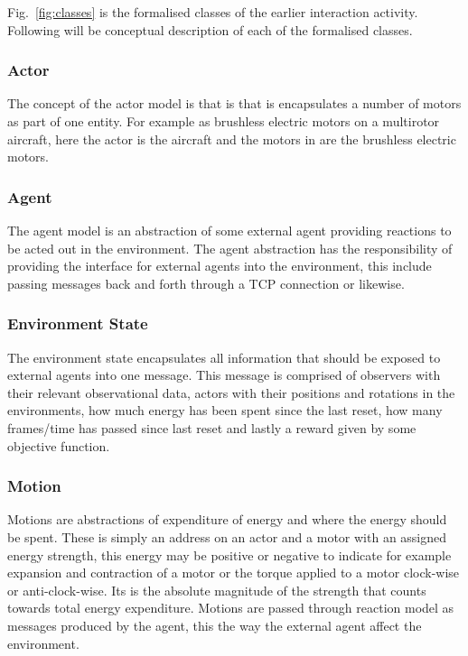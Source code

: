 Fig.~\ref{fig:classes} is the formalised classes of the earlier interaction activity. Following will be conceptual description of each of the formalised classes.

\subsubsection{Actor}

The concept of the actor model is that is that is encapsulates a number of motors as part of one entity. For example as brushless electric motors on a multirotor aircraft, here the actor is the aircraft and the motors in are the brushless electric motors.

\subsubsection{Agent}

The agent model is an abstraction of some external agent providing reactions to be acted out in the environment. The agent abstraction has the responsibility of providing the interface for external agents into the environment, this include passing messages back and forth through a TCP connection or likewise. 

\subsubsection{Environment State}

The environment state encapsulates all information that should be exposed to external agents into one message. This message is comprised of observers  with their relevant observational data, actors with their positions and rotations in the environments, how much energy has been spent since the last reset, how many frames/time has passed since last reset and lastly a reward given by some objective function.


\subsubsection{Motion}

Motions are abstractions of expenditure of energy and where the energy should be spent. These is simply an address on an actor and a motor with an assigned energy strength, this energy may be positive or negative to indicate for example expansion and contraction of a motor or the torque applied to a motor clock-wise or anti-clock-wise. Its is the absolute magnitude of the strength that counts towards total energy expenditure.
Motions are passed through reaction model as messages produced by the agent, this the way the external agent affect the environment. 

